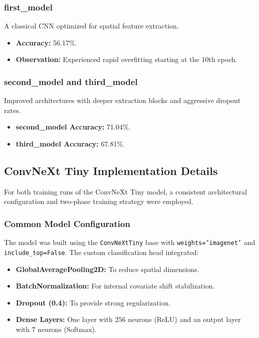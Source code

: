 \documentclass{article}
\begin{document}
\subsubsection{first\_model}
A classical CNN optimized for spatial feature extraction.
\begin{itemize}
    \item \textbf{Accuracy:} 56.17\%.
    \item \textbf{Observation:} Experienced rapid overfitting starting at the 10th epoch.
\end{itemize}

\subsubsection{second\_model and third\_model}
Improved architectures with deeper extraction blocks and aggressive dropout rates.
\begin{itemize}
    \item \textbf{second\_model Accuracy:} 71.04\%.
    \item \textbf{third\_model Accuracy:} 67.81\%.
\end{itemize}

\subsection{ConvNeXt Tiny Implementation Details}
For both training runs of the ConvNeXt Tiny model, a consistent architectural configuration and two-phase training strategy were employed.

\subsubsection{Common Model Configuration}
The model was built using the \texttt{ConvNeXtTiny} base with \texttt{weights='imagenet'} and \texttt{include\_top=False}. The custom classification head integrated:
\begin{itemize}
    \item \textbf{GlobalAveragePooling2D:} To reduce spatial dimensions.
    \item \textbf{BatchNormalization:} For internal covariate shift stabilization.
    \item \textbf{Dropout (0.4):} To provide strong regularization.
    \item \textbf{Dense Layers:} One layer with 256 neurons (ReLU) and an output layer with 7 neurons (Softmax).
\end{itemize}
\end{document}
